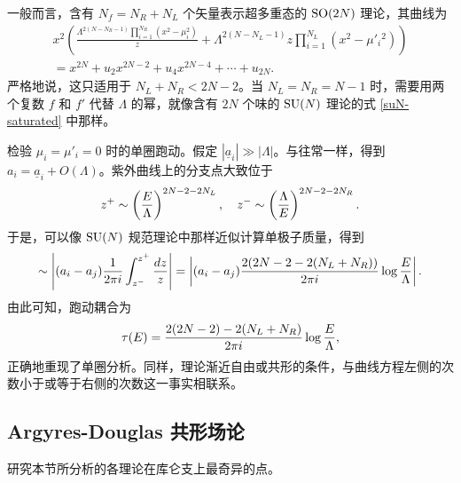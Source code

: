 一般而言，含有 $N_f=N_R+N_L$ 个矢量表示超多重态的 $\mathop{\mathrm{SO}}(2N)$ 理论，其曲线为
\begin{multline}
x^2(\frac{\Lambda^{2(N-N_R-1)}\prod_{i=1}^{N_R}(x^2-\mu_i^2)}z
+\Lambda^{2(N-N_L-1)}z\prod_{i=1}^{N_L}(x^2-\mu'_i{}^2))\\
=x^{2N}+u_2x^{2N-2}+u_4x^{2N-4}+\cdots+u_{2N}.\label{so2NNf}
\end{multline}
严格地说，这只适用于 $N_L+N_R<2N-2$。当 $N_L=N_R=N-1$ 时，需要用两个复数 $f$ 和 $f'$ 代替 $\Lambda$ 的幂，就像含有 $2N$ 个味的 $\mathop{\mathrm{SU}}(N)$ 理论的式 \eqref{suN-saturated} 中那样。

检验 $\mu_i=\mu'_i=0$ 时的单圈跑动。假定 $|\underline a_i|\gg|\Lambda|$。与往常一样，得到 $a_i=\underline a_i+O(\Lambda)$。紫外曲线上的分支点大致位于
\begin{equation}
z^+\sim\left(\frac{E}\Lambda\right)^{2N-2-2N_L},\quad
z^-\sim\left(\frac\Lambda{E}\right)^{2N-2-2N_R}.
\end{equation}
于是，可以像 $\mathop{\mathrm{SU}}(N)$ 规范理论中那样近似计算单极子质量，得到
\begin{equation}
\sim\left|(a_i-a_j)\frac1{2\pi i}\int_{z^-}^{z^+}\frac{dz}z\right|
=\left|(a_i-a_j)\frac{2(2N-2-2(N_L+N_R))}{2\pi i}\log\frac{E}\Lambda\right|.
\end{equation}
由此可知，跑动耦合为
\begin{equation}
\tau(E)=\frac{2(2N-2)-2(N_L+N_R)}{2\pi i}\log\frac{E}\Lambda,
\end{equation}
正确地重现了单圈分析。同样，理论渐近自由或共形的条件，与曲线方程左侧的次数小于或等于右侧的次数这一事实相联系。

\subsection{Argyres-Douglas 共形场论}\label{sec:ADAD}
研究本节所分析的各理论在库仑支上最奇异的点。


